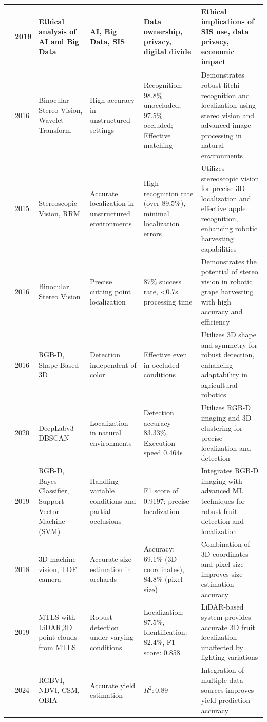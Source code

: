 \documentclass[a4paper,fleqn]{cas-dc}
\begin{document}
\begin{table}[ht]
\begin{tabular} {p{0.4cm}p{0.5cm}p{3cm}p{3.2cm}p{3cm}p{5cm}}
\cite{mark2019ethics} & 2019 & Ethical analysis of AI and Big Data & AI, Big Data, SIS & Data ownership, privacy, digital divide & Ethical implications of SIS use, data privacy, economic impact \\ \midrule
\cite{wang2016localisation} & 2016 & Binocular Stereo Vision, Wavelet Transform & High accuracy in unstructured settings & Recognition: 98.8\% unoccluded, 97.5\% occluded; Effective matching & Demonstrates robust litchi recognition and localization using stereo vision and advanced image processing in natural environments \\ \midrule
\cite{si2015location} & 2015 & Stereoscopic Vision, RRM & Accurate localization in unstructured environments & High recognition rate (over 89.5\%), minimal localization errors & Utilizes stereoscopic vision for precise 3D localization and effective apple recognition, enhancing robotic harvesting capabilities \\ \midrule	
\cite{luo2016vision} & 2016 & Binocular Stereo Vision & Precise cutting point localization & 87\% success rate, <0.7s processing time & Demonstrates the potential of stereo vision in robotic grape harvesting with high accuracy and efficiency \\ \midrule
\cite{barnea2016colour} & 2016 & RGB-D, Shape-Based 3D & Detection independent of color & Effective even in occluded conditions & Utilizes 3D shape and symmetry for robust detection, enhancing adaptability in agricultural robotics \\ \midrule	
\cite{li2020detection} & 2020 & DeepLabv3 + DBSCAN & Localization in natural environments & Detection accuracy 83.33\%, Execution speed 0.464s  & Utilizes RGB-D imaging and 3D clustering for precise localization and detection \\  \midrule
\cite{lin2019field} & 2019 & RGB-D, Bayes Classifier, Support Vector Machine (SVM) & Handling variable conditions and partial occlusions & F1 score of 0.9197; precise localization & Integrates RGB-D imaging with advanced ML techniques for robust fruit detection and localization \\ \midrule
\cite{gongal2018apple} & 2018 & 3D machine vision, TOF camera & Accurate size estimation in orchards & Accuracy: 69.1\% (3D coordinates), 84.8\% (pixel size)  & Combination of 3D coordinates and pixel size improves size estimation accuracy \\ \midrule
\cite{gene2019fruit}& 2019 & MTLS with LiDAR,3D point clouds from MTLS & Robust detection under varying conditions & Localization: 87.5\%, Identification: 82.4\%, F1-score: 0.858 & LiDAR-based system provides accurate 3D fruit localization unaffected by lighting variations \\ \midrule
\cite{sumesh2021integration}& 2024 & RGBVI, NDVI, CSM, OBIA & Accurate yield estimation & $R^2: 0.89$ & Integration of multiple data sources improves yield prediction accuracy \\ 
\bottomrule
\end{tabular}
\end{table}
\end{document}

